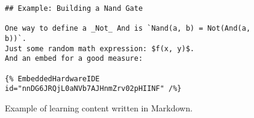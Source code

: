\begin{figure}[H]
\begin{verbatim}
## Example: Building a Nand Gate

One way to define a _Not_ And is `Nand(a, b) = Not(And(a, b))`.
Just some random math expression: $f(x, y)$.
And an embed for a good measure:

{% EmbeddedHardwareIDE id="nnDG6JRQjL0aNVb7AJHnmZrv02pHIINF" /%}
\end{verbatim}



    \caption{Example of learning content written in Markdown.}
    \label{fig:design-markdown-example}
\end{figure}
